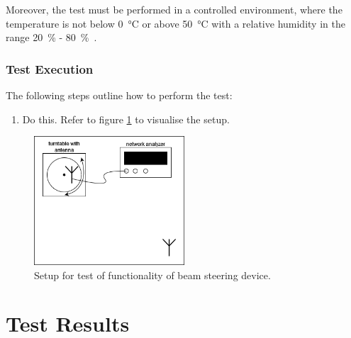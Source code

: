 Moreover, the test must be performed in a controlled environment, where the temperature is not below \SI{0}{\celsius} or above \SI{50}{\celsius} with a relative humidity in the range \SI{20}{\percent} - \SI{80}{\percent}~\cite{hrt_i_data_sheet}.

\subsubsection{Test Execution}
The following steps outline how to perform the test:

\begin{enumerate}
    \item Do this. Refer to figure \ref{fig:experiment-setup} to visualise the setup.
\end{enumerate}

\begin{figure}[h]
    \centering
    \includegraphics[width=0.5\textwidth]{figures/experiment-setup.png}
    \caption{Setup for test of functionality of beam steering device.} \label{fig:experiment-setup}
\end{figure}

\section{Test Results}

